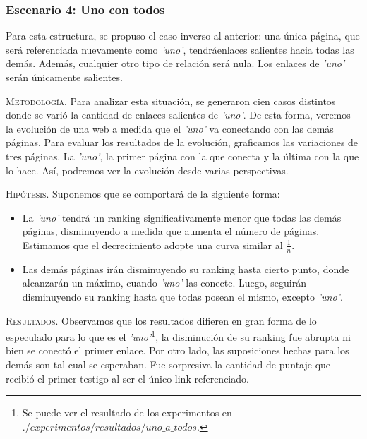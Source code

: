 \vspace{2em}
\subsubsection{Escenario 4: Uno con todos} Para esta estructura, se propuso el caso inverso al anterior: una única página, que será referenciada nuevamente como \textit{'uno'}, tendráenlaces salientes hacia todas las demás. Además, cualquier otro tipo de relación será nula. Los enlaces de \textit{'uno'} serán únicamente salientes.

\vspace{1em}

\vspace{1em}
\noindent \textsc{Metodología}. Para analizar esta situación, se generaron cien casos distintos donde se varió la cantidad de enlaces salientes de \textit{'uno'}. De esta forma, veremos la evolución de una web a medida que el \textit{'uno'} va conectando con las demás páginas. Para evaluar los resultados de la evolución, graficamos las variaciones de tres páginas. La \textit{'uno'}, la primer página con la que conecta y la última con la que lo hace. Así, podremos ver la evolución desde varias perspectivas.

\vspace{1em}
\noindent \textsc{Hipótesis}. Suponemos que se comportará de la siguiente forma:
\begin{itemize}
\item La \textit{'uno'} tendrá un ranking significativamente menor que todas las demás páginas, disminuyendo a medida que aumenta el número de páginas. Estimamos que el decrecimiento adopte una curva similar al $\frac{1}{n}$.
\item Las demás páginas irán disminuyendo su ranking hasta cierto punto, donde alcanzarán un máximo, cuando \textit{'uno'} las conecte. Luego, seguirán disminuyendo su ranking hasta que todas posean el mismo, excepto \textit{'uno'}.
\end{itemize}

\vspace{1em}

\vspace{1em}
\noindent \textsc{Resultados}. Observamos que los resultados difieren en gran forma de lo especulado para lo que es el \textit{'uno'}\footnote{Se puede ver el resultado de los experimentos en $./experimentos/resultados/uno\_a\_todos$.}, la disminución de su ranking fue abrupta ni bien se conectó el primer enlace. Por otro lado, las suposiciones hechas para los demás son tal cual se esperaban. Fue sorpresiva la cantidad de puntaje que recibió el primer testigo al ser el único link referenciado.




